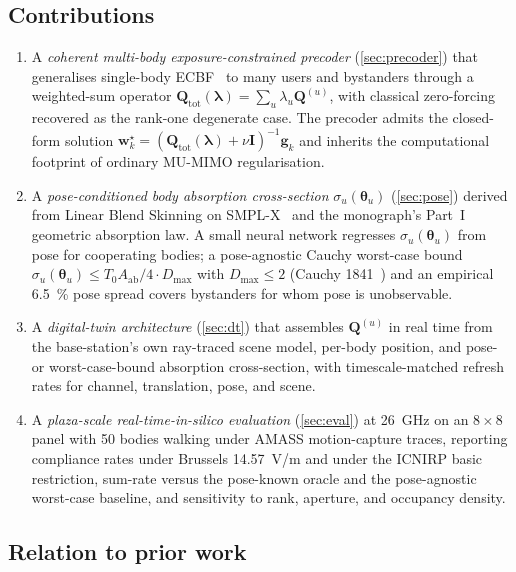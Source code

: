 \documentclass[journal,twoside,onecolumn]{IEEEtran}
\theoremstyle{definition}
\newcommand{\ww}{\mathbf{w}}
\newcommand{\ident}{\mathbf{I}}
\newcommand{\Q}{\mathbf{Q}}
\newcommand{\Aab}{A_{\mathrm{ab}}}
\begin{document}
\subsection{Contributions}

\begin{enumerate}
\item
A \emph{coherent multi-body exposure-constrained precoder}
(\cref{sec:precoder}) that generalises single-body
ECBF~\cite{Hochwald2014,Ying2015} to many users and bystanders
through a weighted-sum operator
$\Q_{\mathrm{tot}}(\bm\lambda)=\sum_u\lambda_u\Q^{(u)}$, with
classical zero-forcing recovered as the rank-one degenerate case.
The precoder admits the closed-form solution
$\ww_k^\star=(\Q_{\mathrm{tot}}(\bm\lambda)+\nu\ident)^{-1}\mathbf{g}_k$
and inherits the computational footprint of ordinary MU-MIMO
regularisation.

\item
A \emph{pose-conditioned body absorption cross-section}
$\sigma_u(\bm\theta_u)$ (\cref{sec:pose}) derived from Linear Blend
Skinning on SMPL-X~\cite{SMPL-X} and the monograph's Part~I
geometric absorption law. A small neural network regresses
$\sigma_u(\bm\theta_u)$ from pose for cooperating bodies; a
pose-agnostic Cauchy worst-case bound
$\sigma_u(\bm\theta_u)\le T_0\Aab/4\cdot D_{\max}$ with
$D_{\max}\le 2$ (Cauchy 1841~\cite{Cauchy1841}) and an empirical
\SI{6.5}{\percent} pose spread covers bystanders for whom pose is
unobservable.

\item
A \emph{digital-twin architecture} (\cref{sec:dt}) that assembles
$\Q^{(u)}$ in real time from the base-station's own ray-traced
scene model, per-body position, and pose- or worst-case-bound
absorption cross-section, with timescale-matched refresh rates for
channel, translation, pose, and scene.

\item
A \emph{plaza-scale real-time-in-silico evaluation}
(\cref{sec:eval}) at 26~GHz on an $8{\times}8$ panel with 50 bodies
walking under AMASS motion-capture traces, reporting compliance
rates under Brussels 14.57~V/m and under the ICNIRP basic
restriction, sum-rate versus the pose-known oracle and the
pose-agnostic worst-case baseline, and sensitivity to rank,
aperture, and occupancy density.
\end{enumerate}

\subsection{Relation to prior work}
\end{document}
